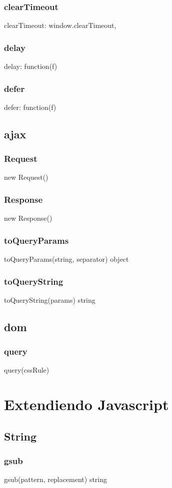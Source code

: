 \subsubsection*{clearTimeout}
clearTimeout: window.clearTimeout,
\subsubsection*{delay}
delay: function(f) {
\subsubsection*{defer}
defer: function(f) {

\subsection{ajax}
\subsubsection*{Request}
new Request()
\subsubsection*{Response}
new Response()
\subsubsection*{toQueryParams}
toQueryParams(string, separator) \rightarrow object
\subsubsection*{toQueryString}
toQueryString(params) \rightarrow string

\subsection{dom}
\subsubsection*{query}
query(cssRule) \rightarrow [HTMLElement...]

\section{Extendiendo Javascript}
\subsection{String}
\subsubsection*{gsub}
gsub(pattern, replacement) \rightarrow string
}}

